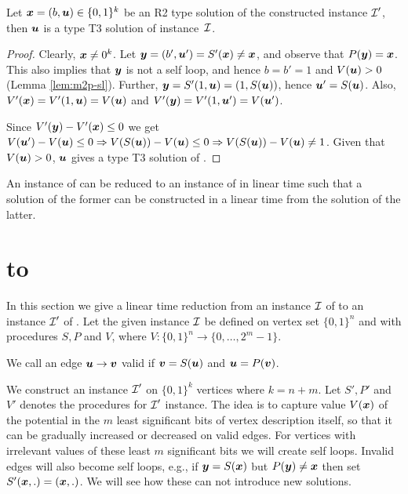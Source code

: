 \begin{lemma}\label{lem:m2p-r2}
Let $\mbox{\boldmath $x$}=(b,\mbox{\boldmath $u$})\in \{0,1\}^k$ be an R2 type solution of the constructed \EOPL instance $\mbox{${\mathcal I}$}'$, then $\mbox{\boldmath $u$}$ is a type T3 solution of \EOML instance~$\mbox{${\mathcal I}$}$.
\end{lemma}
\begin{proof}
Clearly, $\mbox{\boldmath $x$}\neq 0^k$. Let $\mbox{\boldmath $y$} = (b',\mbox{\boldmath $u$}') = S'(\mbox{\boldmath $x$}) \neq \mbox{\boldmath $x$}$, and observe that $P(\mbox{\boldmath $y$}) = \mbox{\boldmath $x$}$. This also implies that $\mbox{\boldmath $y$}$ is not a self loop, and hence $b=b'=1$ and $V(\mbox{\boldmath $u$})>0$ (Lemma \ref{lem:m2p-sl}). Further, $\mbox{\boldmath $y$} = S'(1,\mbox{\boldmath $u$})=(1,S(\mbox{\boldmath $u$}))$, hence $\mbox{\boldmath $u$}'=S(\mbox{\boldmath $u$})$. Also, $V'(\mbox{\boldmath $x$})=V'(1,\mbox{\boldmath $u$})=V(\mbox{\boldmath $u$})$ and $V'(\mbox{\boldmath $y$})=V'(1,\mbox{\boldmath $u$}')=V(\mbox{\boldmath $u$}')$. 

Since $V'(\mbox{\boldmath $y$})-V'(\mbox{\boldmath $x$})\le 0$ we get $V(\mbox{\boldmath $u$}')-V(\mbox{\boldmath $u$})\le 0 \Rightarrow V(S(\mbox{\boldmath $u$})) - V(\mbox{\boldmath $u$}) \le 0\Rightarrow V(S(\mbox{\boldmath $u$})) - V(\mbox{\boldmath $u$})\neq 1$. Given that $V(\mbox{\boldmath $u$})>0$, $\mbox{\boldmath $u$}$ gives a type T3 solution of \EOML.
\end{proof}

\begin{theorem}\label{thm:m2p}
An instance of \EOML can be reduced to an instance of \EOPL in linear time such that a solution of the former can be constructed in a linear time from the solution of the latter. 
\end{theorem}


\section{\EOPL to \EOML}
\label{sec:eopl2eoml}

In this section we give a linear time reduction from an instance $\mbox{${\mathcal I}$}$ of \EOPL to an instance $\mbox{${\mathcal I}$}'$ of \EOML. Let the given \EOPL instance $\mbox{${\mathcal I}$}$ be defined on vertex set $\{0,1\}^n$ and with procedures $S,P$ and $V$, where $V:\{0,1\}^n\rightarrow \{0,\dots,2^m-1\}$. 
\medskip

 We call an edge $\mbox{\boldmath $u$} \rightarrow \mbox{\boldmath $v$}$ valid if $\mbox{\boldmath $v$}=S(\mbox{\boldmath $u$})$ and $\mbox{\boldmath $u$}=P(\mbox{\boldmath $v$})$. 
\medskip

We construct an \EOML instance $\mbox{${\mathcal I}$}'$ on $\{0,1\}^k$ vertices where $k=n+m$. 
Let $S',P'$ and $V'$ denotes the procedures for $\mbox{${\mathcal I}$}'$ instance. 
The idea is to capture value $V(\mbox{\boldmath $x$})$ of the potential in the $m$ least significant bits of vertex description itself, so that it can be gradually increased or decreased on valid edges. For vertices with irrelevant values of these least $m$ significant bits we will create self loops. Invalid edges will also become self loops, e.g., if $\mbox{\boldmath $y$}=S(\mbox{\boldmath $x$})$ but $P(\mbox{\boldmath $y$})\neq \mbox{\boldmath $x$}$ then set $S'(\mbox{\boldmath $x$},.)=(\mbox{\boldmath $x$},.)$. We will see how these can not introduce new solutions. 


